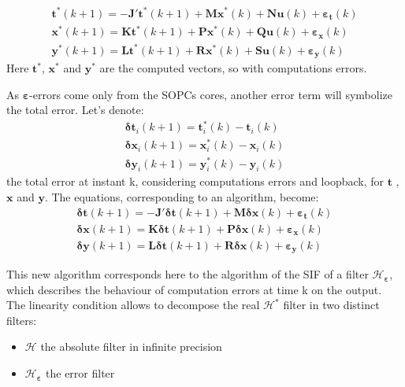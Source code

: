 			\begin{eqnarray} \label{sifalgoerr}
				\boldsymbol{t}^*(k+1) = - \boldsymbol{J'}\boldsymbol{t}^*(k+1) + \boldsymbol{M} \boldsymbol{x}^*(k) + \boldsymbol{N} \boldsymbol{u}(k) + \boldsymbol{\varepsilon_t}(k)\\
				\boldsymbol{x}^*(k+1) = \boldsymbol{K}\boldsymbol{t}^*(k+1) + \boldsymbol{P} \boldsymbol{x}^*(k) + \boldsymbol{Q} \boldsymbol{u}(k) + \boldsymbol{\varepsilon_x}(k) \\
				\boldsymbol{y}^*(k+1) = \boldsymbol{L}\boldsymbol{t}^*(k+1) + \boldsymbol{R} \boldsymbol{x}^*(k) + \boldsymbol{S} \boldsymbol{u}(k) + \boldsymbol{\varepsilon_y}(k) 
			\end{eqnarray}
			Here $\boldsymbol{t}^*$, $\boldsymbol{x}^*$ and $\boldsymbol{y}^*$ are the computed vectors, so with computations errors.

	As $\boldsymbol{\varepsilon}$-errors come only from the SOPCs cores, another error term will symbolize the total error.
			Let's denote:
			\begin{eqnarray}
			\boldsymbol{\delta t}_i(k+1)=\boldsymbol{t}_i^*(k)-\boldsymbol{t}_i(k) \\
			\boldsymbol{\delta x}_i(k+1)=\boldsymbol{x}_i^*(k)-\boldsymbol{x}_i(k) \\
			\boldsymbol{\delta y}_i(k+1)=\boldsymbol{y}_i^*(k)-\boldsymbol{y}_i(k) 
			\end{eqnarray}
			the total error at instant k,
			considering computations errors and loopback, for 
			$\boldsymbol{t}$ , $\boldsymbol{x}$ and $\boldsymbol{y}$.
			The equations, corresponding to an algorithm, become:
			\begin{eqnarray} \label{deltaerr}
				\boldsymbol{\delta t}(k+1) = - \boldsymbol{J'}\boldsymbol{\delta t}(k+1) + \boldsymbol{M} \boldsymbol{\delta x}(k) + \boldsymbol{\varepsilon_t}(k)\\
				\boldsymbol{\delta x}(k+1) = \boldsymbol{K}\boldsymbol{\delta t}(k+1) + \boldsymbol{P} \boldsymbol{\delta x}(k) + \boldsymbol{\varepsilon_x}(k) \\
				\boldsymbol{\delta y}(k+1) = \boldsymbol{L}\boldsymbol{\delta t}(k+1) + \boldsymbol{R} \boldsymbol{\delta x}(k) + \boldsymbol{\varepsilon_y}(k) 
			\end{eqnarray}

			This new algorithm corresponds here to the algorithm of the SIF of a filter $\mathcal{H}_{\boldsymbol{\varepsilon}}$,
			which describes the behaviour of computation errors at time k on the output.
			The linearity condition allows to decompose the real $\mathcal{H}^*$ filter in two distinct filters:
			\begin{itemize}
				\item $\mathcal{H}$ the absolute filter in infinite precision
				\item $\mathcal{H}_{\boldsymbol{\varepsilon}}$ the error filter
			\end{itemize}

